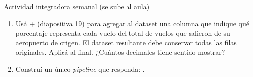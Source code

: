 \documentclass[8pt]{beamer}
\begin{document}
\begin{frame}[fragile]{Actividad integradora semanal (se sube al aula)}
	\begin{enumerate}[start = 4]
		\item Usá  +  (diapositiva 19) para agregar al dataset una columna  que indique qué porcentaje representa cada vuelo del total de vuelos que salieron de su aeropuerto de origen. El dataset resultante debe conservar todas las filas originales. Aplicá  al final. ¿Cuántos decimales tiene sentido mostrar?

		\item Construí un único \textit{pipeline} que responda: \textit{}.
	\end{enumerate}
\end{frame}
\end{document}
